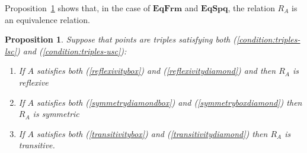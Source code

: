 \documentclass{article}[a4paper]
\newtheorem{proposition}{Proposition}%
\theoremstyle{definition}
\newcommand{\eqspq}{\mathbf{EqSpq}}
\newcommand{\eqfrm}{\mathbf{EqFrm}}
\begin{document}
Proposition~\ref{result:prepointEquivRel} shows that, in the case of $\eqfrm$ and $\eqspq$, the relation $R_A$ is an equivalence relation.
\begin{proposition}
\label{result:prepointEquivRel}
Suppose that points are triples satisfying both (\ref{condition:triples-lsc}) and (\ref{condition:triples-usc}):
    \begin{enumerate}
        \item If $A$ satisfies both (\ref{reflexivitybox}) and (\ref{reflexivitydiamond}) and then $R_A$ is reflexive
        \item If $A$ satisfies both (\ref{symmetrydiamondbox}) and (\ref{symmetryboxdiamond}) then $R_A$ is symmetric
         \item If $A$ satisfies both (\ref{transitivitybox}) and (\ref{transitivitydiamond}) then $R_A$ is transitive.
    \end{enumerate}
\end{proposition}
\end{document}

